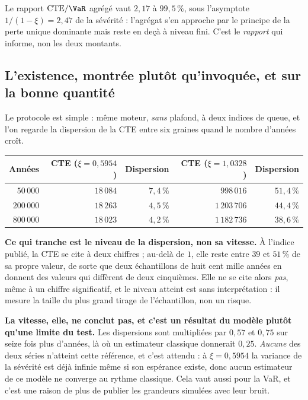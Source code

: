 Le rapport $\mathrm{CTE}/\VaR$ agrégé vaut $2{,}17$ à $99{,}5\,\%$, sous l'asymptote
$1/(1-\xi) = 2{,}47$ de la sévérité : l'agrégat s'en approche par le principe de la perte unique
dominante mais reste en deçà à niveau fini. C'est le \emph{rapport} qui informe, non les deux
montants.

\subsection*{L'existence, montrée plutôt qu'invoquée, et sur la bonne quantité}

Le protocole est simple : même moteur, \emph{sans} plafond, à deux indices de queue, et l'on
regarde la dispersion de la CTE entre six graines quand le nombre d'années croît.

\begin{center}\footnotesize
\renewcommand{\arraystretch}{1.25}
\begin{tabular}{@{}r r r r r@{}}
\toprule
\textbf{Années} & \textbf{CTE ($\xi=0{,}5954$)} & \textbf{Dispersion} & \textbf{CTE ($\xi=1{,}0328$)} & \textbf{Dispersion} \\
\midrule
$50\,000$ & $18\,084$ & $7{,}4\,\%$ & $998\,016$ & $51{,}4\,\%$ \\
$200\,000$ & $18\,263$ & $4{,}5\,\%$ & $1\,203\,706$ & $44{,}4\,\%$ \\
$800\,000$ & $18\,023$ & $4{,}2\,\%$ & $1\,182\,736$ & $38{,}6\,\%$ \\
\bottomrule
\end{tabular}
\end{center}

\vspace{4pt}
\noindent \textbf{Ce qui tranche est le niveau de la dispersion, non sa vitesse.} À l'indice
publié, la CTE se cite à deux chiffres ; au-delà de $1$, elle reste entre $39$ et $51\,\%$ de sa
propre valeur, de sorte que deux échantillons de huit cent mille années en donnent des valeurs
qui diffèrent de deux cinquièmes. Elle ne se cite alors \emph{pas}, même à un chiffre
significatif, et le niveau atteint est sans interprétation : il mesure la taille du plus grand
tirage de l'échantillon, non un risque.

\begin{attention}
\textbf{La vitesse, elle, ne conclut pas, et c'est un résultat du modèle plutôt qu'une limite du
test.} Les dispersions sont multipliées par $0{,}57$ et $0{,}75$ sur seize fois plus d'années, là
où un estimateur classique donnerait $0{,}25$. \emph{Aucune} des deux séries n'atteint cette
référence, et c'est attendu : à $\xi = 0{,}5954$ la variance de la sévérité est déjà
infinie même si son espérance existe, donc aucun estimateur de ce modèle ne converge au rythme
classique. Cela vaut aussi pour la VaR, et c'est une raison de plus de publier les grandeurs
simulées avec leur bruit.
\end{attention}

